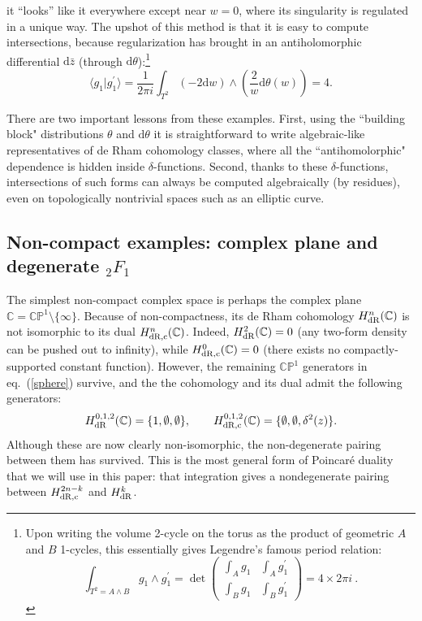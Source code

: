 \documentclass[11pt]{article}
\renewcommand{\d}{\text{d}}
\newcommand{\be}{\begin{equation}}
\newcommand{\ee}{\end{equation}}
\newcommand{\CP}{\mathbb{CP}}
\newcommand{\Cbb}{\mathbb{C}}
\begin{document}
it ``looks'' like it everywhere except near $w=0$, where its singularity is regulated in a unique way.
The upshot of this method is that it is easy to compute intersections, because regularization has brought in an antiholomorphic differential $\d\bar{z}$ (through $\d\theta$):\footnote{
Upon writing the volume 2-cycle on the torus as the product of geometric $A$ and $B$ 1-cycles,
this essentially gives Legendre's famous period relation:
\be \int_{T^2=A\wedge B} g_1\wedge g_1^\prime
= \det\left(\begin{array}{cc} \int_A g_1 & \int_A g_1^\prime \\ \int_B g_1 & \int_B g_1^\prime\end{array}\right) = 4\times 2\pi i\ .
\ee}
\be
 \langle g_1|g_1^\prime\rangle = \frac{1}{2\pi i} \int_{T^2}  (-2 \d w) \wedge \left(\frac{2}{w} \d\theta(w)\right)  = 4.
\ee

There are two important lessons from these examples.  First, using the ``building block" distributions
$\theta$ and $\d\theta$ it is straightforward to write algebraic-like representatives of de Rham cohomology classes,
where all the ``antihomolorphic" dependence is hidden inside $\delta$-functions.
Second, thanks to these $\delta$-functions, intersections of such forms can always be computed algebraically (by residues),
even on topologically nontrivial spaces such as an elliptic curve.



\subsection{Non-compact examples: complex plane and degenerate ${}_2F_1$ \label{sec:non-compact ex}}

The simplest non-compact complex space is perhaps the complex plane $\Cbb=\CP^1\setminus\{\infty\}$.
Because of non-compactness, its de Rham cohomology $H^n_{\rm dR}(\Cbb)$ is not isomorphic to its dual $H^n_{\rm dR,c}(\Cbb)$.
Indeed, $H^2_{\rm dR}(\Cbb)=0$ (any two-form density can be pushed out to infinity),
while $H^0_{\rm dR,c}(\Cbb)=0$ (there exists no compactly-supported constant function).
However, the remaining $\CP^1$ generators in eq.~(\ref{sphere}) survive, and the 
the cohomology and its dual admit the following generators:
\be
 H^{0,1,2}_{\rm dR}(\Cbb) = \{1, \emptyset, \emptyset\},\qquad
 H^{0,1,2}_{\rm dR,c}(\Cbb) = \{\emptyset,\emptyset,\delta^2(z)\} .
\ee
Although these are now clearly non-isomorphic, the non-degenerate pairing between them has survived.
This is the most general form of Poincar\'e duality that we will use in this paper:
that integration gives a nondegenerate pairing between $H_{\rm dR,c}^{2n-k}$ and $H^{k}_{\rm dR}$.
\end{document}
